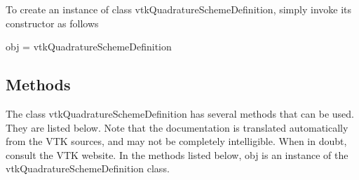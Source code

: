 To create an instance of class vtk\-Quadrature\-Scheme\-Definition, simply invoke its constructor as follows \begin{DoxyVerb}  obj = vtkQuadratureSchemeDefinition
\end{DoxyVerb}
 \hypertarget{vtkwidgets_vtkxyplotwidget_Methods}{}\subsection{Methods}\label{vtkwidgets_vtkxyplotwidget_Methods}
The class vtk\-Quadrature\-Scheme\-Definition has several methods that can be used. They are listed below. Note that the documentation is translated automatically from the V\-T\-K sources, and may not be completely intelligible. When in doubt, consult the V\-T\-K website. In the methods listed below, {\ttfamily obj} is an instance of the vtk\-Quadrature\-Scheme\-Definition class. 
